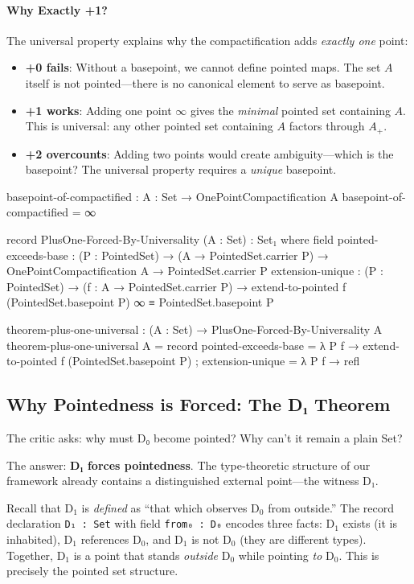 \documentclass[11pt,a4paper]{book}
\begin{document}
\paragraph{Why Exactly +1?}
The universal property explains why the compactification adds \emph{exactly one} point:
\begin{itemize}
\item \textbf{+0 fails}: Without a basepoint, we cannot define pointed maps. The set 
$A$ itself is not pointed---there is no canonical element to serve as basepoint.
\item \textbf{+1 works}: Adding one point $\infty$ gives the \emph{minimal} pointed set 
containing $A$. This is universal: any other pointed set containing $A$ factors through $A_+$.
\item \textbf{+2 overcounts}: Adding two points would create ambiguity---which is the 
basepoint? The universal property requires a \emph{unique} basepoint.
\end{itemize}

\begin{code}
basepoint-of-compactified : {A : Set} → OnePointCompactification A
basepoint-of-compactified = ∞

record PlusOne-Forced-By-Universality (A : Set) : Set₁ where
  field
    pointed-exceeds-base : (P : PointedSet) → (A → PointedSet.carrier P) 
                         → OnePointCompactification A → PointedSet.carrier P
    extension-unique : (P : PointedSet) → (f : A → PointedSet.carrier P) 
                     → extend-to-pointed f (PointedSet.basepoint P) ∞ ≡ PointedSet.basepoint P

theorem-plus-one-universal : (A : Set) → PlusOne-Forced-By-Universality A
theorem-plus-one-universal A = record
  { pointed-exceeds-base = λ P f → extend-to-pointed f (PointedSet.basepoint P)
  ; extension-unique = λ P f → refl
  }
\end{code}

\subsection{Why Pointedness is Forced: The D₁ Theorem}

The critic asks: why must D₀ become pointed? Why can't it remain a plain Set?

The answer: \textbf{D₁ forces pointedness}. The type-theoretic structure of our 
framework already contains a distinguished external point---the witness D₁.

Recall that D$_1$ is \emph{defined} as ``that which observes D$_0$ from outside.'' 
The record declaration \texttt{D₁ : Set} with field \texttt{from₀ : D₀} encodes 
three facts: D$_1$ exists (it is inhabited), D$_1$ references D$_0$, and D$_1$ is 
not D$_0$ (they are different types). Together, D$_1$ is a point that stands 
\emph{outside} D$_0$ while pointing \emph{to} D$_0$. This is precisely the 
pointed set structure.
\end{document}
